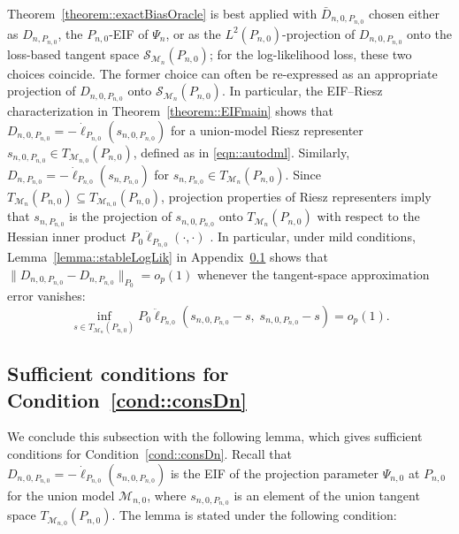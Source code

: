 \documentclass[11pt]{article}
\theoremstyle{definition}
\begin{document}
 Theorem~\ref{theorem::exactBiasOracle} is best applied with \(\bar D_{n,0,P_{n,0}}\) chosen either as \(D_{n,P_{n,0}}\), the \(P_{n,0}\)-EIF of \(\Psi_n\), or as the \(L^2(P_{n,0})\)-projection of \(D_{n,0,P_{n,0}}\) onto the loss-based tangent space \(\mathcal{S}_{\mathcal{M}_n}(P_{n,0})\); for the log-likelihood loss, these two choices coincide. The former choice can often be re-expressed as an appropriate projection of \(D_{n,0,P_{n,0}}\) onto \(\mathcal{S}_{\mathcal{M}_n}(P_{n,0})\). In particular, the EIF--Riesz characterization in Theorem~\ref{theorem::EIFmain} shows that \(D_{n,0,P_{n,0}} = -\dot{\ell}_{P_{n,0}}(s_{n,0,P_{n,0}})\) for a union-model Riesz representer \(s_{n,0,P_{n,0}} \in T_{\mathcal{M}_{n,0}}(P_{n,0})\), defined as in \eqref{eqn::autodml}. Similarly, \(D_{n,P_{n,0}} = -\dot{\ell}_{P_{n,0}}(s_{n,P_{n,0}})\) for \(s_{n,P_{n,0}} \in T_{\mathcal{M}_n}(P_{n,0})\). Since \(T_{\mathcal{M}_n}(P_{n,0}) \subseteq T_{\mathcal{M}_{n,0}}(P_{n,0})\), projection properties of Riesz representers imply that \(s_{n,P_{n,0}}\) is the projection of \(s_{n,0,P_{n,0}}\) onto \(T_{\mathcal{M}_n}(P_{n,0})\) with respect to the Hessian inner product \(P_0 \ddot{\ell}_{P_{n,0}}(\cdot,\cdot)\) \citep{bickel1993efficient}. In particular, under mild conditions, Lemma~\ref{lemma::stableLogLik} in Appendix~\ref{appendix::stable} shows that \(\|D_{n,0,P_{n,0}} - D_{n,P_{n,0}}\|_{P_0} = o_p(1)\) whenever the tangent-space approximation error vanishes:
\[
\inf_{s \in T_{\mathcal{M}_n}(P_{n,0})} P_0 \ddot{\ell}_{P_{n,0}}(s_{n,0,P_{n,0}} - s,\; s_{n,0,P_{n,0}} - s) = o_p(1).
\]

\subsection{Sufficient conditions for Condition~\ref{cond::consDn}}

 

  \label{appendix::stable}


We conclude this subsection with the following lemma, which gives sufficient conditions for Condition~\ref{cond::consDn}. Recall that $D_{n,0,P_{n,0}} = -\dot{\ell}_{P_{n,0}}(s_{n,0,P_{n,0}})$ is the EIF of the projection parameter $\Psi_{n,0}$ at $P_{n,0}$ for the union model $\mathcal{M}_{n,0}$, where $s_{n,0,P_{n,0}}$ is an element of the union tangent space $T_{\mathcal{M}_{n,0}}(P_{n,0})$. The lemma is stated under the following condition:
\end{document}

